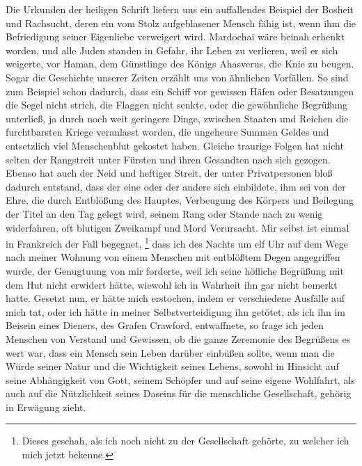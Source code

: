 Die Urkunden der heiligen Schrift liefern uns ein auffallendes Beispiel der
Bosheit und Rachsucht, deren ein vom Stolz aufgeblasener Mensch fähig ist, wenn
ihm die Befriedigung seiner Eigenliebe verweigert wird.
Mardochai wäre beinah
erhenkt worden, und alle Juden standen in Gefahr, ihr Leben zu verlieren, weil
er sich weigerte, vor Haman, dem Günstlinge des Königs
Ahasverus, die Knie zu
beugen. Sogar die Geschichte unserer Zeiten erzählt uns von
ähnlichen Vorfällen.
So sind zum Beispiel schon dadurch, dass ein Schiff vor gewissen Häfen oder Besatzungen
die Segel nicht strich, die Flaggen nicht senkte, oder die gewöhnliche
Begrüßung
unterließ, ja durch noch weit geringere Dinge, zwischen Staaten und Reichen die
furchtbarsten Kriege veranlasst worden, die ungeheure Summen Geldes
und
entsetzlich viel Menschenblut gekostet haben. Gleiche traurige Folgen hat nicht
selten der Rangstreit unter Fürsten und ihren Gesandten nach sich gezogen.
Ebenso
hat auch der Neid und heftiger Streit, der unter Privatpersonen bloß dadurch
entstand, dass der eine oder der andere sich einbildete, ihm sei von der Ehre,
die durch Entblößung des Hauptes,
Verbeugung des Körpers und Beilegung der Titel
an den Tag gelegt wird, seinem Rang oder Stande nach zu wenig widerfahren, oft
blutigen Zweikampf und Mord Verursacht. Mir selbst ist einmal
in Frankreich
der Fall begegnet, \label{kap9_ab2_duell_penn}\footnote{Dieses geschah, als ich
noch nicht zu der
Gesellschaft gehörte, zu welcher ich mich jetzt bekenne.}
 dass ich des Nachts um
elf Uhr auf dem Wege nach meiner Wohnung von einem Menschen mit entblößtem Degen
angegriffen wurde, der Genugtuung von mir forderte, weil ich
seine höfliche
Begrüßung mit dem Hut nicht erwidert hätte, wiewohl ich in
Wahrheit ihn gar
nicht bemerkt hatte. Gesetzt nun, er hätte mich erstochen, indem er verschiedene
Ausfälle auf mich tat, oder ich hätte in meiner Selbstverteidigung ihn
getötet, als ich ihn im Beisein eines Dieners, des Grafen
Crawford,
entwaffnete, so frage ich jeden Menschen von Verstand und Gewissen, ob die ganze
Zeremonie des Begrüßens es wert war, dass ein Mensch sein Leben darüber einbüßen
sollte, wenn man die Würde seiner Natur und die Wichtigkeit seines Lebens,
sowohl in Hinsicht auf seine Abhängigkeit von Gott, seinem Schöpfer und auf
seine eigene Wohlfahrt, als auch auf die Nützlichkeit seines Daseins für die
menschliche Gesellschaft, gehörig in Erwägung zieht.

